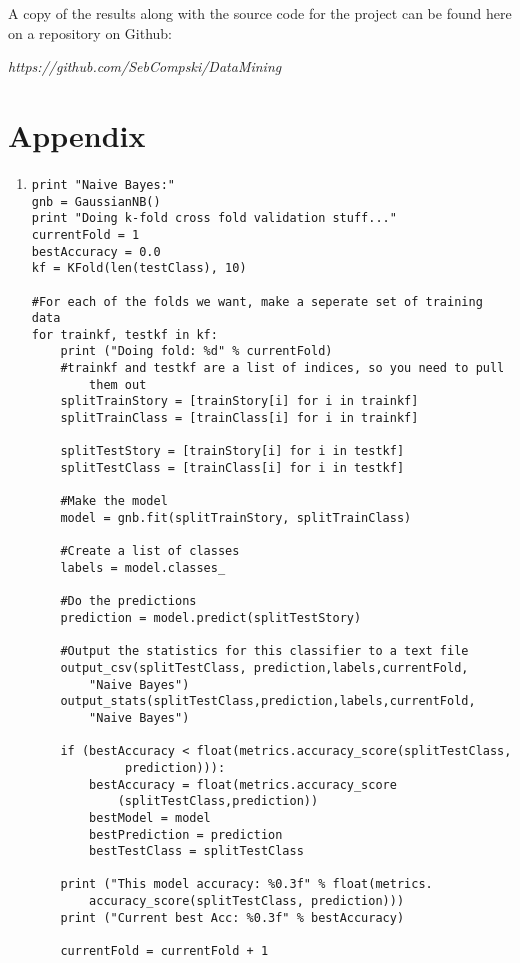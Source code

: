 \documentclass[11pt]{article}
\begin{document}
A copy of the results along with the source code for the project can be found here on a repository on Github:

\begin{center}
\textit{https://github.com/SebCompski/DataMining}
\end{center}

\section{Appendix}
\begin{enumerate}
\item
\begin{lstlisting}[frame=single]
print "Naive Bayes:"
gnb = GaussianNB()
print "Doing k-fold cross fold validation stuff..."
currentFold = 1
bestAccuracy = 0.0
kf = KFold(len(testClass), 10)

#For each of the folds we want, make a seperate set of training data
for trainkf, testkf in kf:
    print ("Doing fold: %d" % currentFold)
    #trainkf and testkf are a list of indices, so you need to pull
        them out
    splitTrainStory = [trainStory[i] for i in trainkf]
    splitTrainClass = [trainClass[i] for i in trainkf]
    
    splitTestStory = [trainStory[i] for i in testkf]
    splitTestClass = [trainClass[i] for i in testkf]
    
    #Make the model
    model = gnb.fit(splitTrainStory, splitTrainClass)
    
    #Create a list of classes
    labels = model.classes_
    
    #Do the predictions
    prediction = model.predict(splitTestStory)
    
    #Output the statistics for this classifier to a text file
    output_csv(splitTestClass, prediction,labels,currentFold,
        "Naive Bayes")
    output_stats(splitTestClass,prediction,labels,currentFold,
        "Naive Bayes")
    
    if (bestAccuracy < float(metrics.accuracy_score(splitTestClass,
             prediction))):
        bestAccuracy = float(metrics.accuracy_score
            (splitTestClass,prediction))
        bestModel = model
        bestPrediction = prediction
        bestTestClass = splitTestClass
    
    print ("This model accuracy: %0.3f" % float(metrics.
        accuracy_score(splitTestClass, prediction)))
    print ("Current best Acc: %0.3f" % bestAccuracy)

    currentFold = currentFold + 1


\end{lstlisting}
\end{enumerate}
\end{document}
